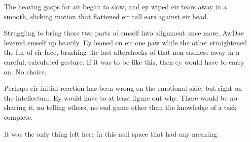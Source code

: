 The heaving gasps for air began to slow, and ey wiped eir tears away in a smooth, slicking motion that flattened eir tall ears against eir head.

Struggling to bring those two parts of emself into alignment once more, AwDae levered emself up heavily. Ey leaned on eir one paw while the other straightened the fur of eir face, brushing the last aftershocks of that non-sadness away in a careful, calculated gesture. If it was to be like this, then ey would have to carry on. No choice.

Perhaps eir initial reaction has been wrong on the emotional side, but right on the intellectual. Ey would have to at least figure out why. There would be no sharing it, no telling others, no end game other than the knowledge of a task complete.

It was the only thing left here in this null space that had any meaning.
